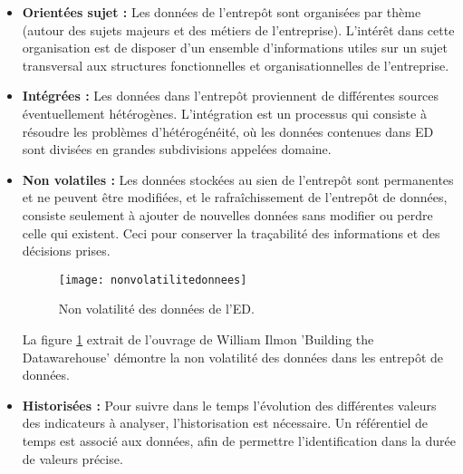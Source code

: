 \begin{itemize}
    \item \textbf{Orientées sujet :} Les données de l’entrepôt sont organisées par thème (autour des sujets majeurs et des métiers de l’entreprise). L’intérêt dans cette organisation est de disposer d’un ensemble d’informations utiles sur un sujet transversal aux structures fonctionnelles et organisationnelles de l’entreprise. \cite{book:5}
    \item \textbf{Intégrées :} Les données dans l’entrepôt proviennent de différentes sources éventuellement hétérogènes. L’intégration est un processus qui consiste à résoudre les problèmes d’hétérogénéité, où les données contenues dans ED sont divisées en grandes subdivisions appelées domaine. \cite{book:6}
    \item \textbf{Non volatiles :} Les données stockées au sien de l’entrepôt sont permanentes et ne peuvent être modifiées, et le rafraîchissement de l’entrepôt de données, consiste seulement à ajouter de nouvelles données sans modifier ou perdre celle qui existent. Ceci pour conserver la traçabilité des informations et des décisions prises. \cite{book:6}
    
    \begin{figure}[H]
        \centering
        \texttt{[image: nonvolatilitedonnees]}
        \caption{Non volatilité des données de l’ED.}
        \label{fig:composantsdudecisionnel}
    \end{figure}

    La figure \ref{fig:composantsdudecisionnel} extrait de l'ouvrage de William Ilmon 'Building the Datawarehouse' \cite{book:7} démontre la non volatilité des données dans les entrepôt de données.

    \item \textbf{Historisées :} Pour suivre dans le temps l’évolution des différentes valeurs des indicateurs à analyser, l’historisation est nécessaire. Un référentiel de temps est associé aux données, afin de permettre l’identification dans la durée de valeurs précise. \cite{book:5}
\end{itemize}



